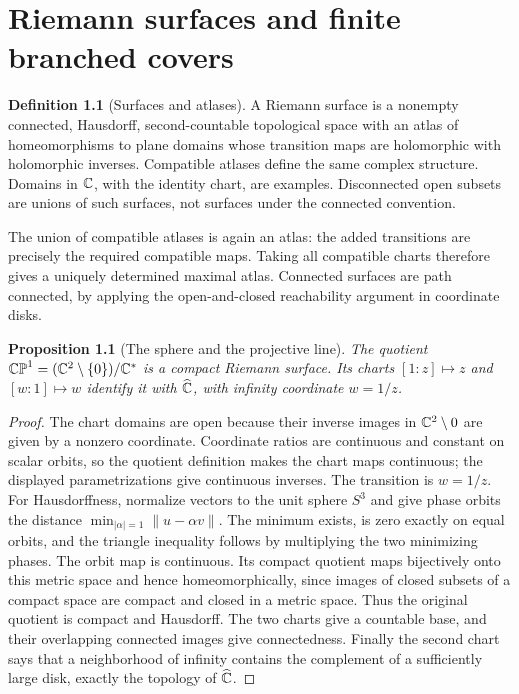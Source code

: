 \documentclass[11pt,a4paper,openany]{book}
\newtheorem{proposition}[theorem]{Proposition}
\theoremstyle{definition}
\newtheorem{definition}[theorem]{Definition}
\theoremstyle{remark}\newtheorem{remark}[theorem]{Remark}
\newcommand{\family}[1]{}
\begin{document}

\chapter{Riemann surfaces and finite branched covers}\label{ch:d12-20}

\begin{definition}[Surfaces and atlases]\label{d12:20-01}\family{D12.20.01}
A Riemann surface is a nonempty connected, Hausdorff, second-countable topological
space with an atlas of homeomorphisms to plane domains whose transition
maps are holomorphic with holomorphic inverses. Compatible atlases define
the same complex structure. Domains in $\mathbb C$, with the identity chart,
are examples. Disconnected open subsets are unions of such surfaces,
not surfaces under the connected convention.
\end{definition}
The union of compatible atlases is again an atlas: the added transitions
are precisely the required compatible maps. Taking all compatible charts
therefore gives a uniquely determined maximal atlas. Connected surfaces
are path connected, by applying the open-and-closed reachability argument
in coordinate disks.

\begin{proposition}[The sphere and the projective line]\label{d12:20-02}\family{D12.20.02}
The quotient $\mathbb{CP}^1=(\mathbb C^2\setminus\{0\})/\mathbb C^*$ is a compact
Riemann surface. Its charts $[1:z]\mapsto z$ and $[w:1]\mapsto w$ identify
it with $\widehat{\mathbb C}$, with infinity coordinate $w=1/z$.
\end{proposition}
\begin{proof}
The chart domains are open because their inverse images in $\mathbb C^2\setminus0$
are given by a nonzero coordinate. Coordinate ratios are continuous and
constant on scalar orbits, so the quotient definition makes the chart
maps continuous; the displayed parametrizations give continuous inverses.
The transition is $w=1/z$. For Hausdorffness, normalize vectors to the
unit sphere $S^3$ and give phase orbits the distance
$\min_{|\alpha|=1}\|u-\alpha v\|$. The minimum exists, is zero exactly
on equal orbits, and the triangle inequality follows by multiplying the
two minimizing phases. The orbit map is continuous. Its compact quotient
maps bijectively onto this metric space and hence homeomorphically, since
images of closed subsets of a compact space are compact and closed in a
metric space. Thus the original quotient is compact and Hausdorff.
The two charts give a countable base, and their overlapping connected
images give connectedness. Finally the second chart says that a
neighborhood of infinity contains the complement of a sufficiently large
disk, exactly the topology of $\widehat{\mathbb C}$.
\end{proof}
\end{document}
